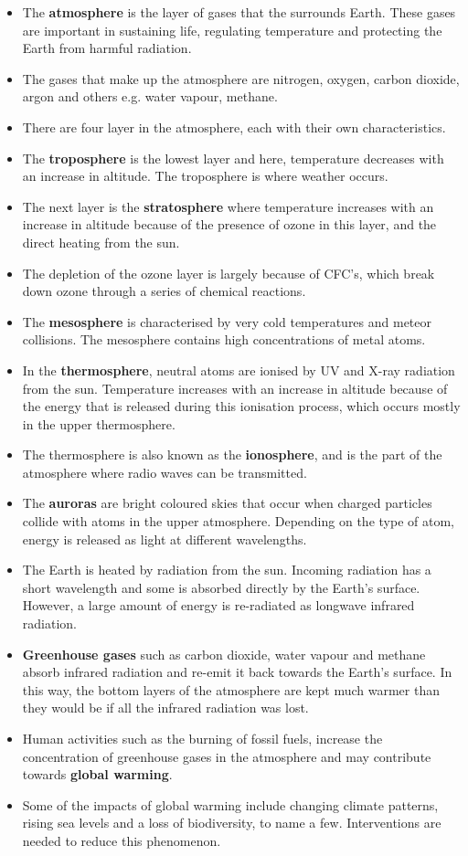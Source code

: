 \begin{itemize}[noitemsep]
\item{The \textbf{atmosphere} is the layer of gases that the surrounds Earth. These gases are important in sustaining life, regulating temperature and protecting the Earth from harmful radiation.}
\item{The gases that make up the atmosphere are nitrogen, oxygen, carbon dioxide, argon and others e.g. water vapour, methane.}
\item{There are four layer in the atmosphere, each with their own characteristics.}
\item{The \textbf{troposphere} is the lowest layer and here, temperature decreases with an increase in altitude. The troposphere is where weather occurs.}
\item{The next layer is the \textbf{stratosphere} where temperature increases with an increase in altitude because of the presence of ozone in this layer, and the direct heating from the sun.}
\item{The depletion of the ozone layer is largely because of CFC's, which break down ozone through a series of chemical reactions.}
\item{The \textbf{mesosphere} is characterised by very cold temperatures and meteor collisions. The mesosphere contains high concentrations of metal atoms.}
\item{In the \textbf{thermosphere}, neutral atoms are ionised by UV and X-ray radiation from the sun. Temperature increases with an increase in altitude because of the energy that is released during this ionisation process, which occurs mostly in the upper thermosphere. }
\item{The thermosphere is also known as the \textbf{ionosphere}, and is the part of the atmosphere where radio waves can be transmitted.}
\item{The \textbf{auroras} are bright coloured skies that occur when charged particles collide with atoms in the upper atmosphere. Depending on the type of atom, energy is released as light at different wavelengths.}
\item{The Earth is heated by radiation from the sun. Incoming radiation has a short wavelength and some is absorbed directly by the Earth's surface. However, a large amount of energy is re-radiated as longwave infrared radiation.}
\item{\textbf{Greenhouse gases} such as carbon dioxide, water vapour and methane absorb infrared radiation and re-emit it back towards the Earth's surface. In this way, the bottom layers of the atmosphere are kept much warmer than they would be if all the infrared radiation was lost.}
\item{Human activities such as the burning of fossil fuels, increase the concentration of greenhouse gases in the atmosphere and may contribute towards \textbf{global warming}.}
\item{Some of the impacts of global warming include changing climate patterns, rising sea levels and a loss of biodiversity, to name a few. Interventions are needed to reduce this phenomenon.}
\end{itemize}

